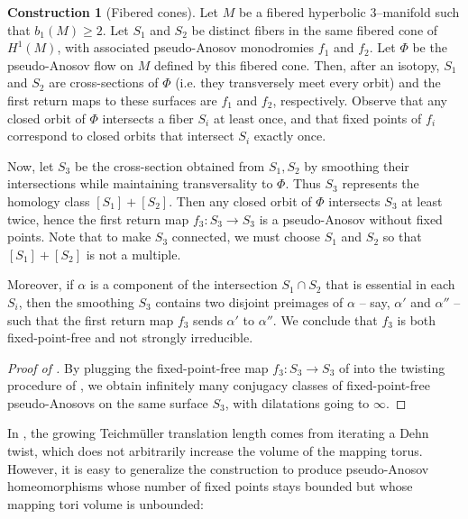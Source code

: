 \documentclass[11pt,letterpaper]{amsart}
\numberwithin{equation}{section}
\theoremstyle{definition}
\newtheorem{construction}[theorem]{Construction}
\newcommand{\from}{\colon} %
\begin{document}
\begin{construction}[Fibered cones]\label{Const:cone}
Let $M$ be a fibered hyperbolic $3$--manifold such that $b_1(M) \geq 2$. Let $S_1$ and $S_2$ be distinct fibers in the same fibered cone of $H^1(M)$, with associated pseudo-Anosov monodromies $f_1$ and $f_2$. Let $\Phi$ be the pseudo-Anosov flow on $M$ defined by this fibered cone. Then, after an isotopy, $S_1$ and $S_2$ are cross-sections of $\Phi$ (i.e. they transversely meet every orbit) and the first return maps to these surfaces are $f_1$ and $f_2$, respectively.
Observe that any closed orbit of $\Phi$ intersects a fiber $S_i$ at least once, and that fixed points of $f_i$ correspond to closed orbits that intersect $S_i$ exactly once.

Now, let $S_3$ be the cross-section obtained from $S_1 , S_2$ by smoothing their intersections while maintaining transversality to $\Phi$. Thus $S_3$ represents the homology class $[S_1] + [S_2]$. 
Then any closed orbit of $\Phi$ intersects $S_3$ at least twice, hence the first return map $f_3 \from S_3 \to S_3$ is a pseudo-Anosov without fixed points. Note that to make $S_3$ connected, we must choose $S_1$ and $S_2$ so that  $[S_1] + [S_2]$ is not a multiple. 

Moreover, if $\alpha$ is a component of the intersection $S_1\cap S_2$ that is essential in each $S_i$, then the smoothing $S_3$ contains two disjoint preimages of $\alpha$ -- say, $\alpha'$ and $\alpha''$ -- such that the first return map $f_3$ sends $\alpha'$ to $\alpha''$. We conclude that 
 $f_{3}$ is both fixed-point-free and not strongly irreducible. 
%
\end{construction}

\begin{proof}[Proof of ]
By plugging the fixed-point-free map $f_3 \from S_3 \to S_3$ of  into the twisting procedure of , we obtain infinitely many conjugacy classes of fixed-point-free pseudo-Anosovs on the same surface $S_3$, with dilatations going to $\infty$. 
\end{proof}



In , the growing Teichm{\"u}ller translation length comes from iterating a Dehn twist, which does not arbitrarily increase the volume of the mapping torus. However, it is easy to generalize the construction to produce pseudo-Anosov homeomorphisms whose number of fixed points stays bounded but whose mapping tori volume is unbounded: 
\end{document}
